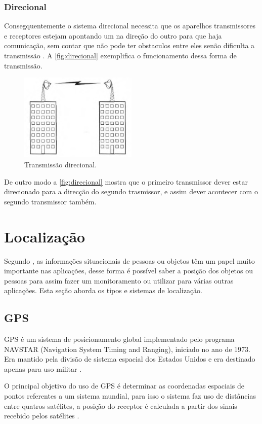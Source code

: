         \subsubsection{Direcional}
        \par
        Consegquentemente o sistema direcional necessita que os aparelhos transmissores e receptores estejam apontando um na direção do outro para que haja comunicação, sem contar que não pode ter obstaculos entre eles senão dificulta a transmissão \cite{torres2001}. A \autoref{fig:direcional} exemplifica o funcionamento dessa forma de transmissão.
        \begin{figure}[H]
              \caption{\label{fig:direcional}{Transmissão direcional.}}
              \centering
              \includegraphics[width=0.5\textwidth]{Figuras/transmissao_radio_direcional.PNG}
        \end{figure}
        \par
        De outro modo a \autoref{fig:direcional} mostra que o primeiro transmissor dever estar direcionado para a direcção do segundo trasmissor, e assim dever acontecer com o segundo transmissor também.
            
\section{Localização}
\par
Segundo \citeauthor{rfid2009review}, as informações situacionais de pessoas ou objetos têm um papel muito importante nas aplicações, desse forma é possível saber a posição dos objetos ou pessoas para assim fazer um monitoramento ou utilizar para várias outras aplicações. Esta seção aborda os tipos e sistemas de localização.
    \subsection{GPS}
    \par
    GPS é um sistema de posicionamento global implementado pelo programa NAVSTAR (Navigation System Timing and Ranging), iniciado no ano de 1973. Era mantido pela divisão de sistema espacial dos Estados Unidos e era destinado apenas para uso militar \cite{gpsEduardo2005}.
    \par
   O principal objetivo do uso de GPS é determinar as coordenadas espaciais de pontos referentes a um sistema mundial, para isso o sistema faz uso de distâncias entre quatros satélites, a posição do receptor é calculada a partir dos sinais recebido pelos satélites \cite{gpsEduardo2005}.

